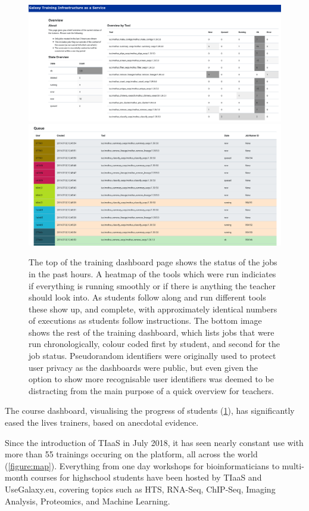 \documentclass[a4paper,num-refs]{oup-contemporary}
\begin{document}
\begin{figure}[bt!]
\centering
\includegraphics[width=\linewidth]{images/dashboard.png}
\includegraphics[width=\linewidth]{images/queue.png}
	\caption{The top of the training dashboard page shows the status of the jobs in the past hours. A heatmap of the tools which were run indiciates if everything is running smoothly or if there is anything the teacher should look into. As students follow along and run different tools these show up, and complete, with approximately identical numbers of executions as students follow instructions. The bottom image shows the rest of the training dashboard, which lists jobs that were run chronologically, colour coded first by student, and second for the job status. Pseudorandom identifiers were originally used to protect user privacy as the dashboards were public, but even given the option to show more recognisable user identifiers was deemed to be distracting from the main purpose of a quick overview for teachers.}\label{figure:dashboard}
\end{figure}

The course dashboard, visualising the progress of students (\ref{figure:dashboard}), has significantly eased the lives trainers, based on anecdotal evidence.

Since the introduction of TIaaS in July 2018, it has seen nearly constant use with more than 55 trainings occuring on the platform, all across the world (\ref{figure:map}). Everything from one day workshops for bioinformaticians to multi-month courses for highschool students have been hosted by TIaaS and UseGalaxy.eu, covering topics such as HTS, RNA-Seq, ChIP-Seq, Imaging Analysis, Proteomics, and Machine Learning.
\end{document}
